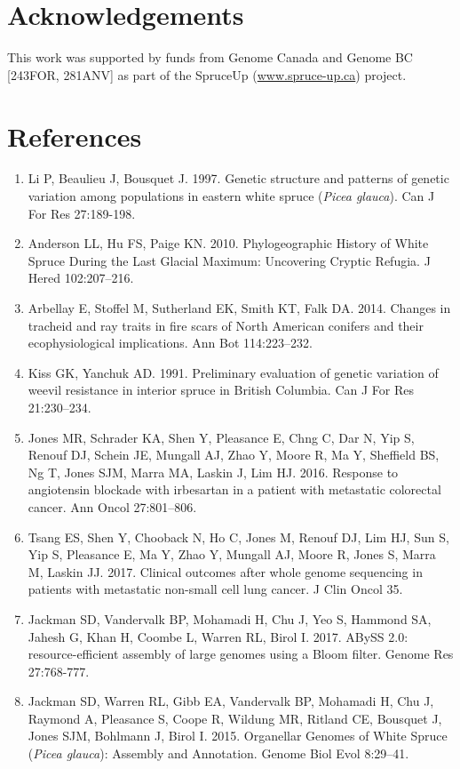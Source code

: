 \documentclass[titlepage,11pt, oneside]{article}   	%
\begin{document}
\section*{Acknowledgements}
This work was supported by funds from Genome Canada and Genome BC [243FOR, 281ANV] as part of the SpruceUp (\url{www.spruce-up.ca}) project.

\section*{References}

\begin{enumerate}
\item Li P, Beaulieu J, Bousquet J. 1997. Genetic structure and patterns of genetic variation among populations in eastern white spruce (\textit{Picea glauca}). Can J For Res 27:189-198.
\item Anderson LL, Hu FS, Paige KN. 2010. Phylogeographic History of White Spruce During the Last Glacial Maximum: Uncovering Cryptic Refugia. J Hered 102:207–216.
\item Arbellay E, Stoffel M, Sutherland EK, Smith KT, Falk DA. 2014. Changes in tracheid and ray traits in fire scars of North American conifers and their ecophysiological implications. Ann Bot 114:223–232.
\item Kiss GK, Yanchuk AD. 1991. Preliminary evaluation of genetic variation of weevil resistance in interior spruce in British Columbia. Can J For Res 21:230–234.
\item Jones MR, Schrader KA, Shen Y, Pleasance E, Chng C, Dar N, Yip S, Renouf DJ, Schein JE, Mungall AJ, Zhao Y, Moore R, Ma Y, Sheffield BS, Ng T, Jones SJM, Marra MA, Laskin J, Lim HJ. 2016. Response to angiotensin blockade with irbesartan in a patient with metastatic colorectal cancer. Ann Oncol 27:801–806.
\item Tsang ES, Shen Y, Chooback N, Ho C, Jones M, Renouf DJ, Lim HJ, Sun S, Yip S, Pleasance E, Ma Y, Zhao Y, Mungall AJ, Moore R, Jones S, Marra M, Laskin JJ. 2017. Clinical outcomes after whole genome sequencing in patients with metastatic non-small cell lung cancer. J Clin Oncol 35.
\item Jackman SD, Vandervalk BP, Mohamadi H, Chu J, Yeo S, Hammond SA, Jahesh G, Khan H, Coombe L, Warren RL, Birol I. 2017. ABySS 2.0: resource-efficient assembly of large 
genomes using a Bloom filter. Genome Res 27:768-777.
\item Jackman SD, Warren RL, Gibb EA, Vandervalk BP, Mohamadi H, Chu J, Raymond A, Pleasance S, Coope R, Wildung MR, Ritland CE, Bousquet J, Jones SJM, Bohlmann J, Birol I. 2015. Organellar Genomes of White Spruce (\textit{Picea glauca}): Assembly and Annotation. Genome Biol Evol 8:29–41.

\end{enumerate}
\end{document}
